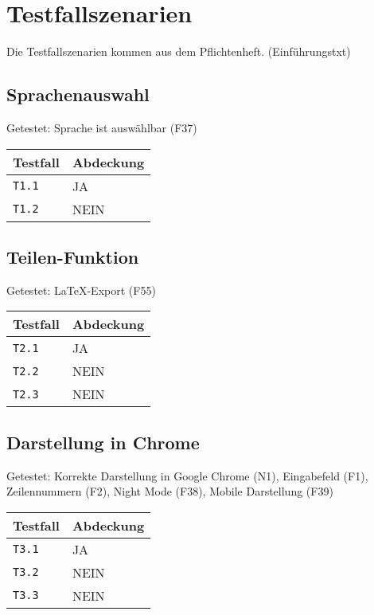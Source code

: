 \documentclass[parskip=full,11pt,twoside]{scrartcl}
\newcommand{\testline}[2]{
    \texttt{#1} & \ifthenelse{\equal{#2}{JA}}{\cellcolor{green!20}}{\cellcolor{red!20}}#2 \\ \hline
}
\begin{document}
\section{Testfallszenarien}
    Die Testfallszenarien kommen aus dem Pflichtenheft. (Einführungstxt)

\subsection{Sprachenauswahl}
    Getestet:
    Sprache ist auswählbar (F37)

    \label{shortcuts}
    \begin{center}
        \begin{tabular}{ p{9cm} p{4cm}}
            Testfall & Abdeckung \\ \hline
            \testline{T1.1}{JA}
            \testline{T1.2}{NEIN}
        \end{tabular}
    \end{center}

\subsection{Teilen-Funktion}
    Getestet:
    LaTeX-Export (F55)

    \label{shortcuts}
    \begin{center}
        \begin{tabular}{ p{9cm} p{4cm}}
            Testfall & Abdeckung \\ \hline
            \testline{T2.1}{JA}
            \testline{T2.2}{NEIN}
            \testline{T2.3}{NEIN}
        \end{tabular}
    \end{center}

\subsection{Darstellung in Chrome}
    Getestet:
    Korrekte Darstellung in Google Chrome (N1),
    Eingabefeld (F1),
    Zeilennummern (F2),
    Night Mode (F38),
    Mobile Darstellung (F39)

    \label{shortcuts}
    \begin{center}
        \begin{tabular}{ p{9cm} p{4cm}}
            Testfall & Abdeckung \\ \hline
            \testline{T3.1}{JA}
            \testline{T3.2}{NEIN}
            \testline{T3.3}{NEIN}
        \end{tabular}
    \end{center}
\end{document}
